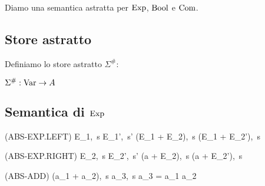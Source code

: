 Diamo una semantica astratta per $\mathrm{Exp}$, $\mathrm{Bool}$ e $\mathrm{Com}$.

\subsection{Store astratto}

Definiamo lo store astratto $\Sigma^\#:$

\begin{center}
	$ \Sigma^\# : \mathrm{Var} \rightarrow A $
\end{center}

\subsection{Semantica di $\mathrm{Exp}$}

\begin{center}
	(ABS-EXP.LEFT)
	\prooftree
		\langle E_1,\ s \rangle \rightarrow \langle E_1',\ s' \rangle
		\justifies
		\langle (E_1 + E_2),\ s \rangle \rightarrow \langle (E_1 + E_2'),\ s \rangle		
	\endprooftree
\end{center}

\begin{center}
	(ABS-EXP.RIGHT)
	\prooftree
		\langle E_2,\ s \rangle \rightarrow \langle E_2',\ s' \rangle
		\justifies
		\langle (a + E_2),\ s \rangle \rightarrow \langle (a + E_2'),\ s\rangle
	\endprooftree
\end{center}

\begin{center}
	(ABS-ADD)
	\prooftree
		\justifies
		\langle (a_1 + a_2),\ s \rangle \rightarrow \langle a_3,\ s \rangle 
		\using a_3 = a_1 \absadd a_2
	\endprooftree
\end{center}
